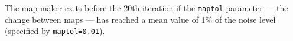 \documentclass[twocolumn,times]{aastex6}
\newcommand{\um}{\micron}
\newcommand{\note}[1]{\textcolor{red}{Note: #1}}
\begin{document}
The map maker exits before the 20th iteration if the \texttt{maptol}
parameter --- the change between maps --- has reached a mean value of 1\%
of the noise level (specified by \texttt{maptol=0.01}).







\end{document}
